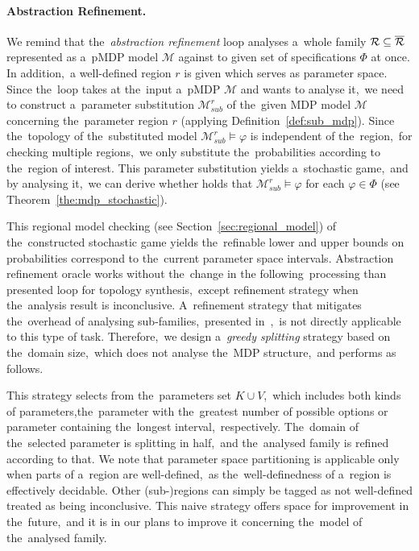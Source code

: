 \paragraph{Abstraction Refinement.}
We remind that the~\textit{abstraction refinement} loop analyses a~whole family $\mathcal{R} \subseteq \overline{\mathcal{R}}$ represented as a~pMDP model $\mathcal{M}$ against to given set of specifications $\varPhi$ at once.
In addition,~a well-defined region $r$ is given which serves as parameter space.
Since the~loop takes at the~input a~pMDP $\mathcal{M}$ and wants to analyse it,~we need to construct a~parameter substitution $\mathcal{M}_{sub}^r$ of the~given MDP model $\mathcal{M}$ concerning the~parameter region $r$ (applying Definition~\ref{def:sub_mdp}).
Since the~topology of the~substituted model $\mathcal{M}_{sub}^r \models \varphi$ is independent of the~region,~for checking multiple regions,~we only substitute the~probabilities according to the~region of interest.
This parameter substitution yields a~stochastic game,~and by analysing it,~we can derive whether holds that $\mathcal{M}_{sub}^r \models \varphi$ for each $\varphi \in \varPhi$ (see Theorem~\ref{the:mdp_stochastic}).

This regional model checking (see Section~\ref{sec:regional_model}) of the~constructed stochastic game yields the~refinable lower and upper bounds on probabilities correspond to the~current parameter space intervals.
Abstraction refinement oracle works without the~change in the following~processing than presented loop for topology synthesis,~except refinement strategy when the~analysis result is inconclusive.
A~refinement strategy that mitigates the~overhead of analysing sub-families,~presented in~\cite{cegar},~is not directly applicable to this type of task.
Therefore,~we design a~\textit{greedy splitting} strategy based on the~domain size,~which does not analyse the~MDP structure,~and performs as follows.


This strategy selects from the~parameters set $K \cup V$,~which includes both kinds of parameters,the~parameter with the~greatest number of possible options or parameter containing the~longest interval,~respectively.
The~domain of the~selected parameter is splitting in half,~and the~analysed family is refined according to that.
We note that parameter space partitioning is applicable only when parts of a~region are well-defined,~as the~well-definedness of a~region is effectively decidable.
Other (sub-)regions can simply be tagged as not well-defined treated as being inconclusive.
This naive strategy offers space for improvement in the~future,~and it is in our plans to improve it concerning the~model of the~analysed family.

